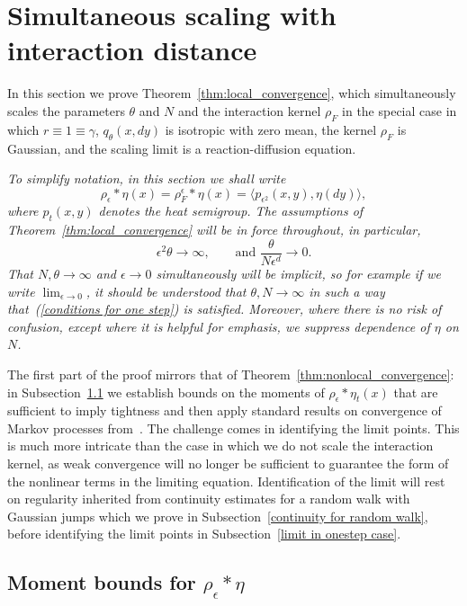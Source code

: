 \documentclass[12pt]{article}
\numberwithin{equation}{section}
\begin{document}
\section{Simultaneous scaling with interaction distance}
\label{subsec:one step convergence proof}

In this section we prove Theorem~\ref{thm:local_convergence},
which simultaneously scales the parameters $\theta$ and $N$ and the interaction 
kernel $\rho_F$ in the special case in which $r\equiv 1\equiv\gamma$, $q_{\theta}(x,dy)$
is isotropic with zero mean, the kernel
$\rho_F$ is Gaussian, and the scaling 
limit is a reaction-diffusion equation.

{\em To simplify notation, in this section we shall write 
$$\rho_\epsilon*\eta(x)=\rho_F^\epsilon*\eta(x)
=\langle p_{\epsilon^2}(x,y),\eta(dy)\rangle,$$
where $p_t(x,y)$ denotes the heat semigroup. 
The assumptions of Theorem~\ref{thm:local_convergence} will be in 
force throughout, in particular,
\begin{equation}
	\label{conditions for one step}
	\epsilon^2\theta\to\infty, \qquad\mbox{and }\frac{\theta}{N\epsilon^d}\to 0.
\end{equation}
That $N, \theta\to \infty$ and $\epsilon\to 0$ simultaneously will be 
implicit, so for example if we write $\lim_{\epsilon\to 0}$, it should be 
understood that $\theta, N\to\infty$ in such a way 
that~(\ref{conditions for one step}) is satisfied. 
Moreover, where there is no risk of confusion, except where it is helpful
for emphasis, we 
suppress dependence of $\eta$ on $N$.}

The first part of the proof mirrors that of Theorem~\ref{thm:nonlocal_convergence}:
in Subsection~\ref{bounds on rhoepsilon}
we establish bounds on the moments of $\rho_\epsilon*\eta_t(x)$ that are sufficient to
imply tightness and then apply standard results on 
convergence of Markov processes from~\cite{ethier/kurtz:1986}. 
The challenge
comes in identifying the limit points. This is much more intricate than the case in 
which we do not scale the interaction kernel, as weak convergence will no longer
be sufficient to guarantee the form of the nonlinear terms in the limiting equation.
Identification of the limit will rest on regularity inherited from continuity 
estimates for a random walk with Gaussian jumps which we prove in 
Subsection~\ref{continuity for random walk}, before
identifying the limit points in Subsection~\ref{limit in onestep case}.

\subsection{Moment bounds for $\rho_\epsilon*\eta$}
\label{bounds on rhoepsilon}
\end{document}
